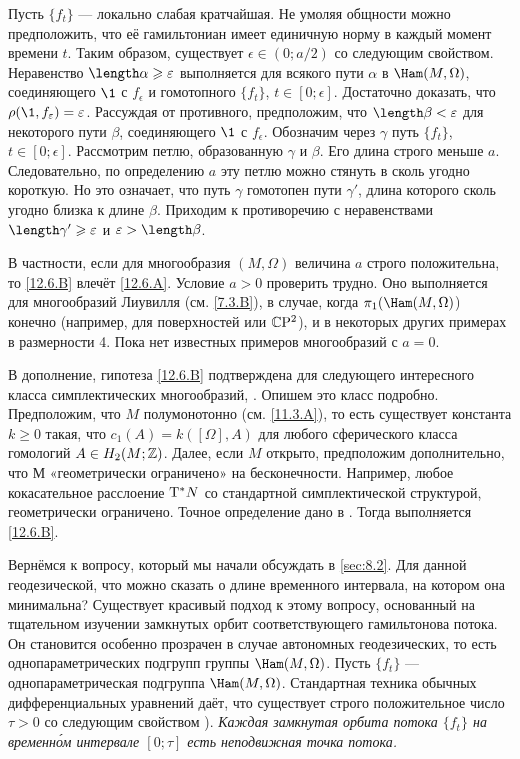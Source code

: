 Пусть $\{f_t\}$ — локально слабая кратчайшая.
Не умоляя общности можно предположить, что её гамильтониан имеет единичную норму в каждый момент времени $t$.
Таким образом, существует $\epsilon \in (0; a/2)$ со следующим свойством.
Неравенство $\length\alpha \ge \epsilon$ выполняется для всякого пути $\alpha$ в $\Ham(M, \Omega)$, соединяющего $\1$ с $f_\epsilon$ и гомотопного $\{f_t\}$, $t\in[0; \epsilon]$.
Достаточно доказать, что $\rho(\1, f_\epsilon) = \epsilon$.
Рассуждая от противного, предположим, что $\length \beta < \epsilon$ для некоторого пути $\beta$, соединяющего $\1$ с $f_\epsilon$.
Обозначим через $\gamma$ путь $\{f_t\}$, $t\in[0; \epsilon]$.
Рассмотрим петлю, образованную $\gamma$ и $\beta$.
Его длина строго меньше $a$.
Следовательно, по определению $a$ эту петлю можно стянуть в сколь угодно короткую.
Но это означает, что путь $\gamma$ гомотопен пути $\gamma'$, длина которого сколь угодно близка к длине $\beta$.
Приходим к противоречию с неравенствами $\length \gamma' \ge\epsilon$ и $\epsilon > \length \beta$.
\qeds

В частности, если для многообразия $(M,\Omega)$ величина $a$ строго
положительна, то \ref{12.6.B} влечёт \ref{12.6.A}. 
Условие $a > 0$ проверить трудно. 
Оно выполняется для многообразий Лиувилля (см. \ref{7.3.B}), в
случае, когда $\pi_1(\Ham(M, \Omega)$) конечно (например, для
поверхностей или $\mathbb{C}\mathrm{P}^2$), и в некоторых других примерах в размерности
4. 
Пока нет известных примеров многообразий с $a = 0$. 

В дополнение, гипотеза \ref{12.6.B} подтверждена для следующего
интересного класса 
симплектических многообразий, \cite{LM2}. Опишем это
класс подробно. 
Предположим, что $M$ полумонотонно (см. \ref{11.3.A}), то есть
существует константа $k \ge 0$ такая, что $c_1(A) = k([\Omega],A)$ для
любого сферического класса гомологий $A \in H_2 (M;\mathbb{Z})$. 
Далее, если $M$ открыто, предположим дополнительно, что $М$
«геометрически ограничено» на бесконечности. 
Например, любое кокасательное расслоение $\mathrm{T}^\ast N$ со стандартной симплектической структурой, геометрически ограничено.
Точное определение дано в \cite{AL}.
Тогда выполняется \ref{12.6.B}.

Вернёмся к вопросу, который мы начали обсуждать в \ref{sec:8.2}.
Для данной геодезической, что можно сказать о длине временного
интервала, на котором она минимальна? 
Существует красивый подход к этому вопросу, основанный на тщательном
изучении замкнутых орбит соответствующего гамильтонова потока. 
Он становится особенно прозрачен в случае автономных геодезических, то
есть однопараметрических подгрупп группы $\Ham(M, \Omega)$. 
Пусть $\{f_t\}$ — однопараметрическая подгруппа $\Ham(M, \Omega)$.
Стандартная техника обычных дифференциальных уравнений даёт, что
существует строго положительное число $\tau > 0$ со следующим
свойством \cite[Sec. 5.7]{HZ}). 
\emph{Каждая замкнутая орбита потока
  $\{f_t\}$ на временн\'{о}м интервале $[0; \tau]$ есть неподвижная
  точка потока.} 

